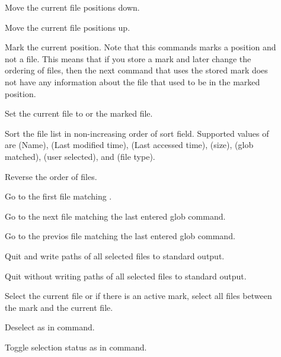 \begin{description}

\item [] Move the current file  positions
down.

\item [] Move the current file  positions up.

\item [] Mark the current position. Note that this commands
marks a position and not a file. This means that if you store a mark
and later change the ordering of files, then the next command that
uses the stored mark does not have any information about the file that
used to be in the marked position.

\item [] Set the current file to  or the
marked file.

\item [] Sort the file list in non-increasing order
of sort field. Supported values of  are 
(Name),  (Last modified time),  (Last accessed
time),  (size),  (glob matched),  (user
selected), and  (file type).

\item [] Reverse the order of files.

\item [] Go to the first file matching .

\item [] Go to the next file matching the last entered glob
command.

\item [] Go to the previos file matching the last entered glob
command.

\item [] Quit and write paths of all selected files to
standard output.

\item [] Quit without writing paths of all selected files to
standard output.

\item [] Select the current file or if there is an active
mark, select all files between the mark and the current file.

\item [] Deselect as in  command.

\item [] Toggle selection status as in  command.
\end{description}

